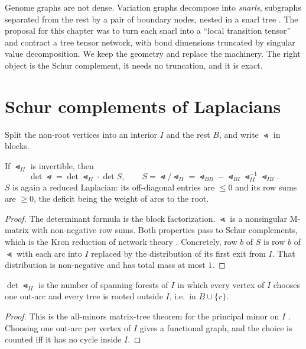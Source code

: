 Genome graphs are not dense. Variation graphs decompose into \emph{snarls}, subgraphs separated from the
rest by a pair of boundary nodes, nested in a snarl tree \cite{Pat18}. The proposal for this chapter was to
turn each snarl into a ``local transition tensor'' and contract a tree tensor network, with bond
dimensions truncated by singular value decomposition. We keep the geometry and replace the machinery. The
right object is the Schur complement, it needs no truncation, and it is exact.

\section{Schur complements of Laplacians}\label{ch16:sec:schur}

Split the non-root vertices into an interior $I$ and the rest $B$, and write $\Lt$ in blocks.

\begin{proposition}[elimination]\label{ch16:prop:schur}
If $\Lt_{II}$ is invertible, then
\[
\det\Lt=\det\Lt_{II}\cdot\det S,\qquad S=\Lt/\Lt_{II}=\Lt_{BB}-\Lt_{BI}\Lt_{II}^{-1}\Lt_{IB}.
\]
$S$ is again a reduced Laplacian: its off-diagonal entries are $\le0$ and its row sums are $\ge0$, the
deficit being the weight of arcs to the root.
\end{proposition}

\begin{proof}
The determinant formula is the block factorization. $\Lt$ is a nonsingular M-matrix with non-negative
row sums. Both properties pass to Schur complements, which is the Kron reduction of network
theory \cite{DB13}. Concretely, row $b$ of $S$ is row $b$ of $\Lt$ with each arc into $I$ replaced by
the distribution of its first exit from $I$. That distribution is non-negative and has total mass at
most $1$.
\end{proof}

\begin{proposition}\label{ch16:prop:forest}
$\det\Lt_{II}$ is the number of spanning forests of $I$ in which every vertex of $I$ chooses one out-arc
and every tree is rooted outside $I$, i.e.\ in $B\cup\{r\}$.
\end{proposition}

\begin{proof}
This is the all-minors matrix-tree theorem for the principal minor on $I$ \cite{Cha82}. Choosing one
out-arc per vertex of $I$ gives a functional graph, and the choice is counted iff it has no cycle
inside $I$.
\end{proof}


